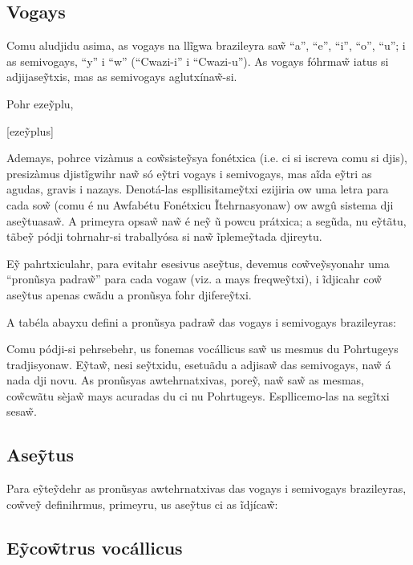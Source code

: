 \documentclass[12pt, a5paper, titlepage]{article}
\begin{document}
\begin{bilingualpages}
    \section{Vogays}
    Comu aludjidu asima, as vogays na llĩgwa brazileyra sa\~w ``a'', ``e'', ``i'',
    ``o'', ``u''; i as semivogays, ``y'' i ``w'' (``Cwazi-i'' i ``Cwazi-u''). As
    vogays fóhrma\~w iatus si adjijase\~ytxis, mas as semivogays aglutxína\~w-si.

    Pohr eze\~yplu,

    [eze\~yplus]

    Ademays, pohrce vizàmus a co\~wsiste\~ysya fonétxica (i.e. ci si iscreva comu
    si djis), presizàmus djistĩgwihr na\~w só e\~ytri vogays i semivogays, mas aĩda
    e\~ytri as agudas, gravis i nazays. Denotá-las espllisitame\~ytxi ezijiria ow
    uma letra para cada so\~w (comu é nu Awfabétu Fonétxicu Ĩtehrnasyonaw) ow awgû
    sistema dji ase\~ytuasa\~w. A primeyra opsa\~w na\~w é ne\~y ũ powcu prátxica;
    a segũda, nu e\~ytãtu, tãbe\~y pódji tohrnahr-si traballyósa si na\~w
    ĩpleme\~ytada djireytu.

    E\~y pahrtxiculahr, para evitahr esesivus ase\~ytus, devemus co\~wve\~ysyonahr
    uma ``pronũsya padra\~w'' para cada vogaw (viz. a mays freqwe\~ytxi), i
    ĩdjicahr co\~w ase\~ytus apenas cwãdu a pronũsya fohr djifere\~ytxi.

    A tabéla abayxu defini a pronũsya padra\~w das vogays i semivogays brazileyras:

    \BrTableVowels

    Comu pódji-si pehrsebehr, us fonemas vocállicus sa\~w us mesmus du Pohrtugeys
    tradjisyonaw. E\~yta\~w, nesi se\~ytxidu, esetuãdu a adjisa\~w das semivogays,
    na\~w á nada dji novu. As pronũsyas awtehrnatxivas, pore\~y, na\~w sa\~w as
    mesmas, co\~wcwãtu sèja\~w mays acuradas du ci nu Pohrtugeys. Espllicemo-las na
    segĩtxi sesa\~w.

    \subsection{Ase\~ytus}
    Para e\~yte\~ydehr as pronũsyas awtehrnatxivas das vogays i semivogays
    brazileyras, co\~wve\~y definihrmus, primeyru, us ase\~ytus ci as ĩdjíca\~w:

    \BrTableDiacritics

    \subsection{E\~yco\~wtrus vocállicus}

\end{bilingualpages}
\end{document}
